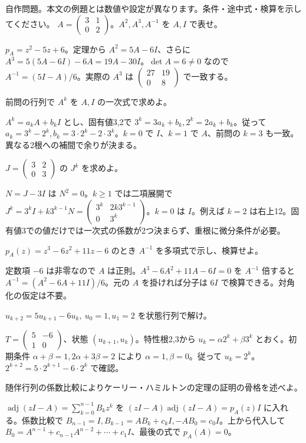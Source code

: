 \documentclass[11pt]{article}
\begin{document}
自作問題。本文の例題とは数値や設定が異なります。条件・途中式・検算を示してください。
\problem[累乗の還元]
$A=\begin{pmatrix}3&1\\0&2\end{pmatrix}$。$A^2,A^3,A^{-1}$ を $A,I$ で表せ。
\begin{ans}
$p_A=z^2-5z+6$。定理から $A^2=5A-6I$、さらに $A^3=5(5A-6I)-6A=19A-30I$。$\det A=6\ne0$ なので $A^{-1}=(5I-A)/6$。実際の $A^3$ は $\begin{pmatrix}27&19\\0&8\end{pmatrix}$ で一致する。
\end{ans}
\problem[一般の累乗]
前問の行列で $A^k$ を $A,I$ の一次式で求めよ。
\begin{ans}
$A^k=a_kA+b_kI$ とし、固有値3,2で $3^k=3a_k+b_k,2^k=2a_k+b_k$。従って $a_k=3^k-2^k,b_k=3\cdot2^k-2\cdot3^k$。$k=0$ で $I$、$k=1$ で $A$、前問の $k=3$ も一致。異なる2根への補間で余りが決まる。
\end{ans}
\newpage
\problem[重根の累乗]
$J=\begin{pmatrix}3&2\\0&3\end{pmatrix}$ の $J^k$ を求めよ。
\begin{ans}
$N=J-3I$ は $N^2=0$。$k\ge1$ では二項展開で $J^k=3^kI+k3^{k-1}N=\begin{pmatrix}3^k&2k3^{k-1}\\0&3^k\end{pmatrix}$。$k=0$ は $I$。例えば $k=2$ は右上12。固有値3での値だけでは一次式の係数が2つ決まらず、重根に微分条件が必要。
\end{ans}
\problem[3次の逆行列]
$p_A(z)=z^3-6z^2+11z-6$ のとき $A^{-1}$ を多項式で示し、検算せよ。
\begin{ans}
定数項 $-6$ は非零なので $A$ は正則。$A^3-6A^2+11A-6I=0$ を $A^{-1}$ 倍すると $A^{-1}=(A^2-6A+11I)/6$。元の $A$ を掛ければ分子は $6I$ で検算できる。対角化の仮定は不要。
\end{ans}
\newpage
\problem[数列]
$u_{k+2}=5u_{k+1}-6u_k,\ u_0=1,u_1=2$ を状態行列で解け。
\begin{ans}
$T=\begin{pmatrix}5&-6\\1&0\end{pmatrix}$、状態 $(u_{k+1},u_k)$。特性根2,3から $u_k=\alpha2^k+\beta3^k$ とおく。初期条件 $\alpha+\beta=1,2\alpha+3\beta=2$ により $\alpha=1,\beta=0$。従って $u_k=2^k$。$2^{k+2}=5\cdot2^{k+1}-6\cdot2^k$ で確認。
\end{ans}
\problem[一般の場合の証明]
随伴行列の係数比較によりケーリー・ハミルトンの定理の証明の骨格を述べよ。
\begin{ans}
$\operatorname{adj}(zI-A)=\sum_{k=0}^{n-1}B_kz^k$ を $(zI-A)\operatorname{adj}(zI-A)=p_A(z)I$ に入れる。係数比較で $B_{n-1}=I,B_{k-1}=AB_k+c_kI,-AB_0=c_0I$。上から代入して $B_0=A^{n-1}+c_{n-1}A^{n-2}+\cdots+c_1I$、最後の式で $p_A(A)=0$。
\end{ans}
\end{document}
